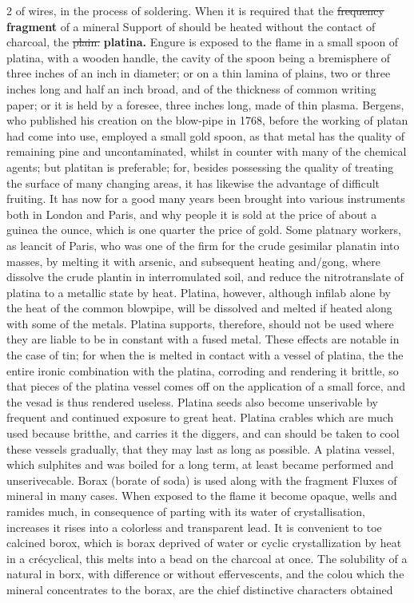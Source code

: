 \documentclass[10pt]{article}
\begin{document}
\begin{multicols}{2}
of wires, in the process of soldering. When it is required that the \sout{frequency} \textbf{fragment} of a mineral Support of should be heated without the contact of charcoal, the \sout{plain.} \textbf{platina.} Engure is exposed to the flame in a small spoon of platina, with a wooden handle, the cavity of the spoon being a bremisphere of three inches of an inch in diameter; or on a thin lamina of plains, two or three inches long and half an inch broad, and of the thickness of common writing paper; or it is held by a foresee, three inches long, made of thin plasma. Bergens, who published his creation on the blow-pipe in 1768, before the working of platan had come into use, employed a small gold spoon, as that metal has the quality of remaining pine and uncontaminated, whilst in counter with many of the chemical agents; but platitan is preferable; for, besides possessing the quality of treating the surface of many changing areas, it has likewise the advantage of difficult fruiting. It has now for a good many years been brought into various instruments both in London and Paris, and why people it is sold at the price of about a guinea the ounce, which is one quarter the price of gold. Some platnary workers, as leancit of Paris, who was one of the firm for the crude gesimilar planatin into masses, by melting it with arsenic, and subsequent heating and/gong, where dissolve the crude plantin in interromulated soil, and reduce the nitrotranslate of platina to a metallic state by heat. Platina, however, although infilab alone by the heat of the common blowpipe, will be dissolved and melted if heated along with some of the metals. Platina supports, therefore, should not be used where they are liable to be in constant with a fused metal. These effects are notable in the case of tin; for when the is melted in contact with a vessel of platina, the the entire ironic combination with the platina, corroding and rendering it brittle, so that pieces of the platina vessel comes off on the application of a small force, and the vesad is thus rendered useless. Platina seeds also become unserivable by frequent and continued exposure to great heat. Platina crables which are much used because britthe, and carries it the diggers, and can should be taken to cool these vessels gradually, that they may last as long as possible. A platina vessel, which sulphites and was boiled for a long term, at least became performed and unserivecable. Borax (borate of soda) is used along with the fragment Fluxes of mineral in many cases. When exposed to the flame it become opaque, wells and ramides much, in consequence of parting with its water of crystallisation, increases it rises into a colorless and transparent lead. It is convenient to toe calcined borox, which is borax deprived of water or cyclic crystallization by heat in a crécyclical, this melts into a bead on the charcoal at once. The solubility of a natural in borx, with difference or without effervescents, and the colou which the mineral concentrates to the borax, are the chief distinctive characters obtained
\end{multicols}
\end{document}
